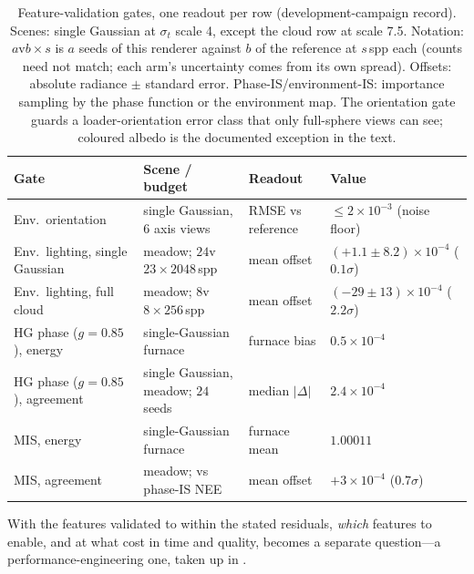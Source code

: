\begin{table}[htp]
  \centering
  \small
  \setlength{\tabcolsep}{3pt}
  \begin{tabular}{@{}>{\raggedright\arraybackslash}p{84pt}
      >{\raggedright\arraybackslash}p{86pt}
      >{\raggedright\arraybackslash}p{58pt}
      >{\raggedright\arraybackslash}p{94pt}@{}}
    \toprule
    Gate & Scene / budget & Readout & Value \\
    \midrule
    Env.\ orientation & single Gaussian, $6$ axis views & RMSE vs reference & $\le 2\times10^{-3}$ (noise floor) \\
    Env.\ lighting, single Gaussian & meadow; $24$v$23 \times 2048$\,spp & mean offset & $(+1.1\pm8.2)\times10^{-4}$ ($0.1\sigma$) \\
    Env.\ lighting, full cloud & meadow; $8$v$8 \times 256$\,spp & mean offset & $(-29\pm13)\times10^{-4}$ ($2.2\sigma$) \\
    \addlinespace[3pt]
    HG phase ($g{=}0.85$), energy & single-Gaussian furnace & furnace bias & $0.5\times10^{-4}$ \\
    HG phase ($g{=}0.85$), agreement & single Gaussian, meadow; $24$ seeds & median $|\Delta|$ & $2.4\times10^{-4}$ \\
    \addlinespace[3pt]
    MIS, energy & single-Gaussian furnace & furnace mean & $1.00011$ \\
    MIS, agreement & meadow; vs phase-IS NEE & mean offset & $+3\times10^{-4}$ ($0.7\sigma$) \\
    \bottomrule
  \end{tabular}
  \caption{Feature-validation gates, one readout per row (development-campaign record). Scenes:
single Gaussian at $\sigma_t$ scale \num{4}, except the cloud row at scale \num{7.5}.
Notation: $a$v$b \times s$ is $a$ seeds of this renderer against $b$ of the reference at
$s$\,spp each (counts need not match; each arm's uncertainty comes from its own spread).
Offsets: absolute radiance $\pm$ standard error. Phase-IS/environment-IS: importance
sampling by the phase function or the environment map. The orientation gate guards a
loader-orientation error class that only full-sphere views can see; coloured albedo is the
documented exception in the text.}
  \label{tab:features}
\end{table}

With the features validated to within the stated residuals, \emph{which} features to enable, and at
what cost in time and quality, becomes a separate question---a performance-engineering one, taken up in
.

